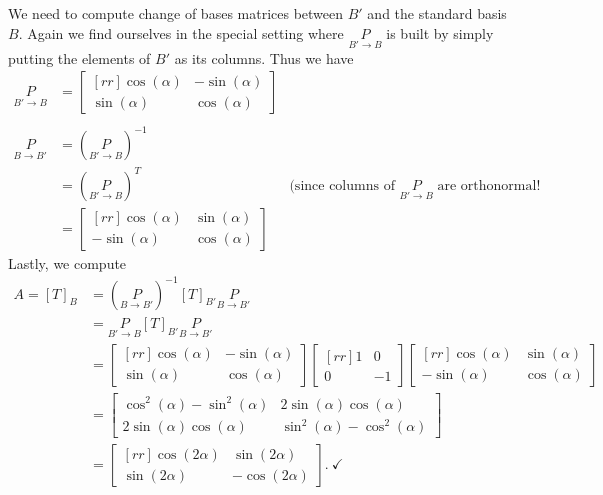 \begin{solution}
We need to compute change of bases matrices between $B'$ and the standard basis $B$. Again we find ourselves in the special setting where $\underset{B'\rightarrow B}{P}$ is built by simply putting the elements of $B'$ as its columns. Thus we have 
\begin{align*}
\underset{B'\rightarrow B}{P}&=\begin{bmatrix}
[rr]
\cos(\alpha) &-\sin(\alpha)\\
\sin(\alpha)&\cos(\alpha)
\end{bmatrix}\\
\\
\underset{B\rightarrow B'}{P}&=(\underset{B'\rightarrow B}{P})^{-1}\\
&=(\underset{B'\rightarrow B}{P})^{T} &\text{(since columns of $\underset{B'\rightarrow B}{P}$ are orthonormal!}\\
&=\begin{bmatrix}
[rr]
\cos(\alpha) &\sin(\alpha)\\
-\sin(\alpha)&\cos(\alpha)
\end{bmatrix}
\end{align*}
Lastly, we compute 
\begin{align*}
A=[T]_B&=(\underset{B\rightarrow B'}{P})^{-1}[T]_{B'}\underset{B\rightarrow B'}{P}\\
&=\underset{B'\rightarrow B}{P}[T]_{B'}\underset{B\rightarrow B'}{P}\\
&=\begin{bmatrix}
[rr]
\cos(\alpha) &-\sin(\alpha)\\
\sin(\alpha)&\cos(\alpha)
\end{bmatrix}
\begin{bmatrix}[rr]
1&0\\
0&-1
\end{bmatrix}
\begin{bmatrix}
[rr]
\cos(\alpha) &\sin(\alpha)\\
-\sin(\alpha)&\cos(\alpha)
\end{bmatrix}\\
&=
\begin{bmatrix}
\cos^2(\alpha)-\sin^2(\alpha) & 2\sin(\alpha)\cos(\alpha)\\
2\sin(\alpha)\cos(\alpha)&\sin^2(\alpha)-\cos^2(\alpha)
\end{bmatrix}
\\
&=\begin{bmatrix}[rr]
\cos(2\alpha)&\sin(2\alpha)\\
\sin(2\alpha)&-\cos(2\alpha)
\end{bmatrix}. \ \checkmark
\end{align*}
\end{solution}
